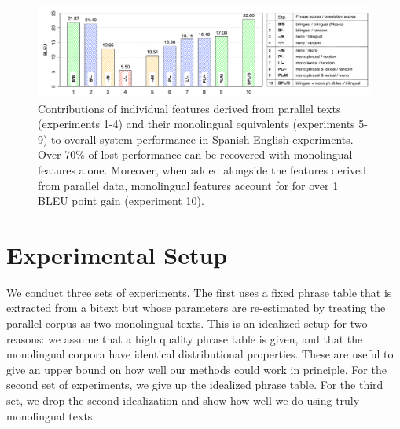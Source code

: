 \documentclass[11pt]{article}
\begin{document}

\begin{figure}[t]
\begin{center}
\includegraphics[width=\linewidth]{../figures/lesionreplacement/lesionreplacementlegend.pdf}
\caption{Contributions of individual features derived from parallel texts (experiments 1-4) and their monolingual equivalents (experiments 5-9) to overall system performance in Spanish-English experiments.  Over 70\% of lost performance can be recovered with monolingual features alone.  Moreover, when added alongside the features derived from parallel data, monolingual features account for for over 1 BLEU point gain (experiment 10).}
\label{fig:lesionreplacement}
\end{center}
\vskip -0.2in
\end{figure}

\section{Experimental Setup} \label{sect:expsetup}

We conduct three sets of experiments. The first uses a fixed phrase table that is extracted from a bitext but whose parameters are re-estimated by treating the parallel corpus as two monolingual texts. This is an idealized setup for two reasons: we assume that a high quality phrase table is given, and that the monolingual corpora have identical distributional properties. These are useful to give an upper bound on how well our methods could work in principle. For the second set of experiments, we give up the idealized phrase table. For the third set, we drop the second idealization and show how well we do using truly monolingual texts.
\end{document}
